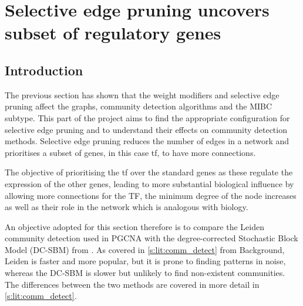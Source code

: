 \chapter{Selective edge pruning uncovers subset of regulatory genes} \label{s:N_I:sel_pruning}
\vspace{3mm}
\vspace{3mm}

\section{Introduction}

The previous section has shown that the weight modifiers and selective edge pruning affect the graphs, community detection algorithms and the MIBC subtype. This part of the project aims to find the appropriate configuration for selective edge pruning and to understand their effects on community detection methods. Selective edge pruning reduces the number of edges in a network and prioritises a subset of genes, in this case \acrfull{tf}, to have more connections.

The objective of prioritising the \acrshort{tf} over the standard genes as these regulate the expression of the other genes, leading to more substantial biological influence by allowing more connections for the TF, the minimum degree of the node increases as well as their role in the network which is analogous with biology. 

An objective adopted for this section therefore is to compare the Leiden \citep{Traag2019-ne} community detection used in PGCNA with the degree-corrected Stochastic Block Model (DC-SBM) from \citep{Karrer2011-si, Peixoto2017-gc}. As covered in \cref{s:lit:comm_detect} from Background, Leiden is faster and more popular, but it is prone to finding patterns in noise, whereas the DC-SBM is slower but unlikely to find non-existent communities. The differences between the two methods are covered in more detail in \cref{s:lit:comm_detect}.


